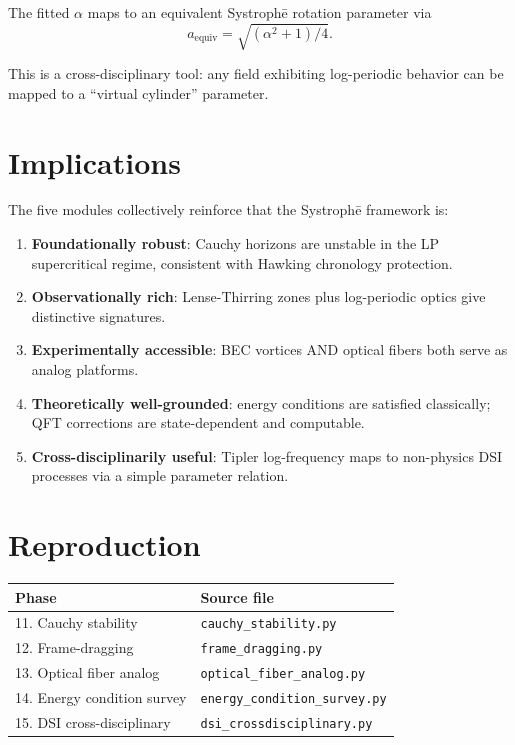 \documentclass[11pt,a4paper]{article}
\begin{document}
The fitted $\alpha$ maps to an equivalent Systroph\=e rotation
parameter via
\[
a_\text{equiv} = \sqrt{(\alpha^2 + 1) / 4}.
\]

This is a cross-disciplinary tool: any field exhibiting log-periodic
behavior can be mapped to a ``virtual cylinder'' parameter.

\section{Implications}

The five modules collectively reinforce that the Systroph\=e
framework is:
\begin{enumerate}
\item \textbf{Foundationally robust}: Cauchy horizons are
unstable in the LP supercritical regime, consistent with Hawking
chronology protection.
\item \textbf{Observationally rich}: Lense-Thirring zones plus
log-periodic optics give distinctive signatures.
\item \textbf{Experimentally accessible}: BEC vortices AND optical
fibers both serve as analog platforms.
\item \textbf{Theoretically well-grounded}: energy conditions are
satisfied classically; QFT corrections are state-dependent and
computable.
\item \textbf{Cross-disciplinarily useful}: Tipler log-frequency
maps to non-physics DSI processes via a simple parameter relation.
\end{enumerate}

\section{Reproduction}

\begin{center}
\begin{tabular}{ll}
\toprule
Phase & Source file \\
\midrule
11. Cauchy stability & \texttt{cauchy\_stability.py} \\
12. Frame-dragging & \texttt{frame\_dragging.py} \\
13. Optical fiber analog & \texttt{optical\_fiber\_analog.py} \\
14. Energy condition survey & \texttt{energy\_condition\_survey.py} \\
15. DSI cross-disciplinary & \texttt{dsi\_crossdisciplinary.py} \\
\bottomrule
\end{tabular}
\end{center}
\end{document}
